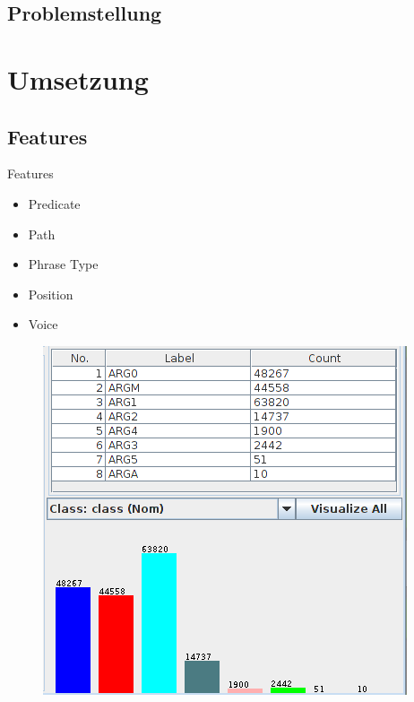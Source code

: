 \documentclass[10pt]{beamer}
\begin{document}
\subsection{Problemstellung}

\section{Umsetzung}
\subsection{Features}
  \begin{frame}{Features}
    \begin{itemize}
     \item Predicate
     \item Path
     \item Phrase Type
     \item Position
     \item Voice
    \end{itemize}
    \begin{figure}
     	\begin{center}
    		\includegraphics[scale=0.3]{class}
    	\end{center}
    
    \end{figure}
    
   \end{frame}
   
\end{document}
